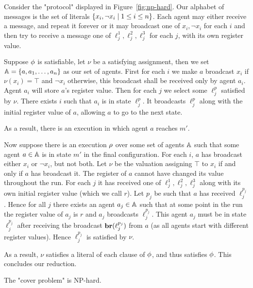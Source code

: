 Consider the "protocol" displayed in Figure~\ref{fig:np-hard}.
Our alphabet of messages is the set of literals $\{x_i, \neg x_i \mid 1 \leq i \leq n\}$.
Each agent may either receive a message, and repeat it forever or it may broadcast one of $x_i, \neg x_i$ for each $i$ and then try to receive a message one of $\ell_j^1, \ell_j^2, \ell_j^3$ for each $j$, with its own register value.

Suppose $\phi$ is satisfiable, let $\nu$ be a satisfying assignment, then we set $\mathbb{A} = \{a, a_1, \ldots, a_n\}$ as our set of agents. First for each $i$ we make $a$ broadcast $x_i$ if $\nu(x_i)= \top$ and $\neg x_i$ otherwise, this broadcast shall be received only by agent $a_i$. Agent $a_i$ will store $a$'s register value.
Then for each $j$ we select some $\ell_j^p$ satisfied by $\nu$. There exists $i$ such that $a_i$ is in state $\ell_j^p$. It broadcasts $\ell_j^p$ along with the initial register value of $a$, allowing $a$ to go to the next state.

As a result, there is an execution in which agent $a$ reaches $m'$.

Now suppose there is an execution $\rho$ over some set of agents $\mathbb{A}$ such that some agent $a \in \mathbb{A}$ is in state $m'$ in the final configuration.
For each $i$, $a$ has broadcast either $x_i$ or $\neg x_i$, but not both.
Let $\nu$ be the valuation assigning $\top$ to $x_i$ if and only if $a$ has broadcast it.
The register of $a$ cannot have changed its value throughout the run. 
For each $j$ it has received one of $\ell_j^1, \ell_j^2, \ell_j^3$ along with its own initial register value (which we call $r$). Let $p_j$ be such that $a$ has received $\ell_j^{p_j}$.
Hence for all $j$ there exists an agent $a_j \in \mathbb{A}$ such that at some point in the run the register value of $a_j$ is $r$ and $a_j$ broadcasts $\ell_j^{p_j}$.
This agent $a_j$ must be in state $\ell_j^{p_j}$ after receiving the broadcast $\textbf{br}(\ell_j^{p_j})$ from $a$ (as all agents start with different register values).
Hence $\ell_j^{p_j}$ is satisfied by $\nu$. 

As a result, $\nu$ satisfies a literal of each clause of $\phi$, and thus satisfies $\phi$. This concludes our reduction.


\begin{proposition}
	\label{prop:np-hard-query-cover}
	The "cover problem" is NP-hard.
\end{proposition}


